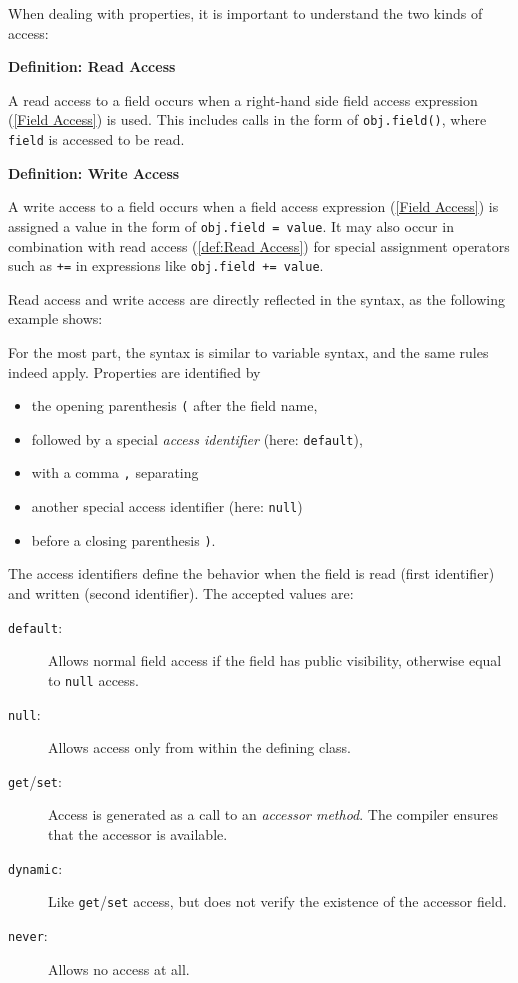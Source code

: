 \documentclass{article}
\newcommand{\expr}[1]{\texttt{#1}}
\newenvironment{myshaded}
  {\def\FrameCommand{\fboxsep=\topsep\colorbox{bgcolor}}%
  \MakeFramed {\advance\hsize-\width \FrameRestore}}%
 {\endMakeFramed}
\newcommand{\define}[3][Definition]
	{\begin{myshaded}\noindent\textbf{#1: #2}\par\nobreak\noindent\ignorespaces#3\label{def:#2}\end{myshaded}}
\newcommand{\tref}[2]{#1 (\ref{#2})}
\newcommand{\haxe}[2][]{%
}
\begin{document}
When dealing with properties, it is important to understand the two kinds of access:

\define{Read Access}{A read access to a field occurs when a right-hand side \tref{field access expression}{Field Access} is used. This includes calls in the form of \expr{obj.field()}, where \expr{field} is accessed to be read.}

\define{Write Access}{A write access to a field occurs when a \tref{field access expression}{Field Access} is assigned a value in the form of \expr{obj.field = value}. It may also occur in combination with \tref{read access}{def:Read Access} for special assignment operators such as \expr{+=} in expressions like \expr{obj.field += value}.} 

Read access and write access are directly reflected in the syntax, as the following example shows:

\haxe{assets/Property.hx}

For the most part, the syntax is similar to variable syntax, and the same rules indeed apply. Properties are identified by

\begin{itemize}
	\item the opening parenthesis \expr{(} after the field name,
	\item followed by a special \emph{access identifier} (here: \expr{default}),
	\item with a comma \expr{,} separating
	\item another special access identifier (here: \expr{null})
	\item before a closing parenthesis \expr{)}.
\end{itemize}

The access identifiers define the behavior when the field is read (first identifier) and written (second identifier). The accepted values are:

\begin{description}
	\item[\expr{default}:] Allows normal field access if the field has public visibility, otherwise equal to \expr{null} access.
	\item[\expr{null}:] Allows access only from within the defining class.
	\item[\expr{get}/\expr{set}:] Access is generated as a call to an \emph{accessor method}. The compiler ensures that the accessor is available.
	\item[\expr{dynamic}:] Like \expr{get}/\expr{set} access, but does not verify the existence of the accessor field.
	\item[\expr{never}:] Allows no access at all.
\end{description}
\end{document}
